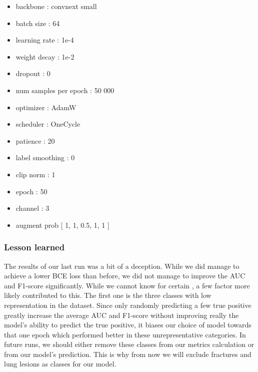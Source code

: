 \documentclass[11pt]{article}
\begin{document}
            \begin{multicols}{2}

            \begin{itemize}
                \centering %
                \item backbone : convnext small
                \item batch size : 64
                \item learning rate : 1e-4
                \item weight decay : 1e-2
                \item dropout : 0
                \item num samples per epoch : 50 000
                \item optimizer : AdamW
                \item scheduler : OneCycle
                \item patience : 20
                \item label smoothing : 0
                \item clip norm : 1
                \item epoch : 50
                \item channel : 3
                \item augment prob [ 1, 1, 0.5, 1, 1 ]
            \end{itemize}
            \end{multicols}
        \subsubsection{Lesson learned}
            The results of our last run was a bit of a deception. While we did manage to achieve a lower BCE loss than before,
            we did not manage to improve the AUC and F1-score significantly. While we cannot know for certain , a few factor more
            likely contributed to this. The first one is the three classes with low representation in the dataset. Since only randomly predicting
            a few true positive greatly increase the average AUC and F1-score without improving really the model's ability to predict the true positive,
            it biases our choice of model towards that one epoch which performed better in these unrepresentative categories.
            In future runs, we should either remove these classes from our metrics calculation or from our model's prediction. This is why from now we will exclude fractures
            and lung lesions as classes for our model.
\end{document}
